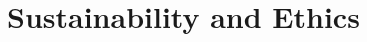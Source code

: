 \newpage
{}
\setlength{\parindent}{0pt}

\section{Sustainability and Ethics} \label{sustainability & ethics}